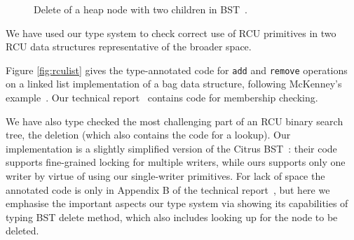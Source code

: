 \begin{figure}[!t]
\begin{subfigure}[b]{.4\linewidth}
\label{fig:del2.6}
\end{subfigure}
\caption{\textsf{Delete} of a heap node with two children in BST~\cite{Arbel:2014:CUR:2611462.2611471}.}
\label{fig:del2}
\end{figure}
We have used our type system to check correct use of RCU primitives in two RCU data structures representative of the broader space.

Figure \ref{fig:rculist} gives the type-annotated code for \lstinline|add| and \lstinline|remove| operations on a linked list implementation of a bag data structure, following McKenney's example~\cite{McKenney2015SomeEO}.
Our technical report~\cite{isotek} contains code for membership checking.

We have also type checked the most challenging part of an RCU binary search tree, the deletion (which also contains the code for a lookup).
Our implementation is a slightly simplified version of the Citrus BST~\cite{Arbel:2014:CUR:2611462.2611471}: their code supports fine-grained locking for multiple writers, while ours supports only one writer by virtue of using our single-writer primitives. For lack of space the annotated code is only in Appendix B of the technical report~\cite{isotek}, but here we emphasise the important aspects our type system via showing its capabilities of typing BST delete method, which also includes looking up for the node to be deleted.%

